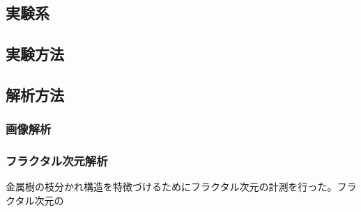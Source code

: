 \documentclass[autodetect-engine,dvi=dvipdfmx,a4paper,ja=standard,oneside,openany,11pt,draft]{bxjsarticle}
\begin{document}
\subsection{実験系}
\subsection{実験方法}
\subsection{解析方法}
\subsubsection{画像解析}
\subsubsection{フラクタル次元解析}
金属樹の枝分かれ構造を特徴づけるためにフラクタル次元の計測を行った。フラクタル次元の



\ifdraft{
  
  
}{}
\end{document}
